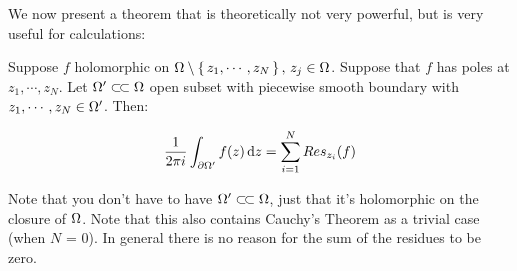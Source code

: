 We now present a theorem that is theoretically not very powerful, but is very useful for calculations:


\begin{theorem}

Suppose $f$ holomorphic on $\Omega \setminus \set{ z_1,\cdots, z_N}, \, z_j \in \Omega $. Suppose that $f$ has poles at $z_1,\cdots, z_N$. Let $\om ' \ssubset \om$ open subset with piecewise smooth boundary with $z_1,\cdots, z_N \in \Omega '$. Then:

\begin{align*}
    \frac{1}{2\pi i} \int_{\partial \om '} f(z) \dif z = \sum_{i=1}^N Res_{z_i} (f)
\end{align*}

\end{theorem}

\begin{note}
Note that you don't have to have $\om ' \ssubset \om$, just that it's holomorphic on the closure of $\Omega$. Note that this also contains Cauchy's Theorem as a trivial case (when $N$ = 0). In general there is no reason for the sum of the residues to be zero.
\end{note}





